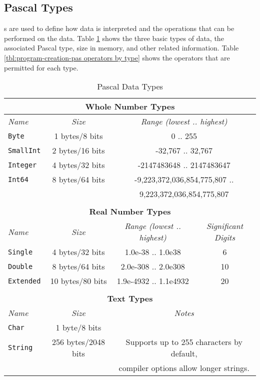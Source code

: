 \clearpage
\subsection{Pascal Types} %
\label{sub:program-creation-pas_types}

s are used to define how data is interpreted and the operations that can be performed on the data. Table \ref{tbl:program-creation-pas-types} shows the three basic types of data, the associated Pascal type, size in memory, and other related information. Table \ref{tbl:program-creation-pas operators by type} shows the operators that are permitted for each type.

\begin{table}[h] 
\begin{minipage}{\textwidth}
\centering
\begin{tabular}{|l|c|c|c|}
\hline
\multicolumn{4}{|c|}{\textbf{Whole Number Types}} \\
\hline
\emph{Name} & \emph{Size} & \multicolumn{2}{c|}{\emph{Range (lowest .. highest)}} \\
\hline
\texttt{Byte} & 1 bytes/8 bits & \multicolumn{2}{c|}{0 .. 255} \\
\texttt{SmallInt} & 2 bytes/16 bits & \multicolumn{2}{c|}{-32,767 .. 32,767} \\
\texttt{Integer} & 4 bytes/32 bits & \multicolumn{2}{c|}{-2147483648 .. 2147483647} \\
\texttt{Int64}    & 8 bytes/64 bits & \multicolumn{2}{c|}{-9,223,372,036,854,775,807 ..} \\
  & & \multicolumn{2}{c|}{9,223,372,036,854,775,807} \\
\hline
\multicolumn{4}{c}{} \\
\hline
\multicolumn{4}{|c|}{\textbf{Real Number Types}} \\
\hline
\emph{Name} & \emph{Size} & \emph{Range (lowest .. highest)} & \emph{Significant Digits} \\
\hline
\texttt{Single} & 4 bytes/32 bits & 1.0e-38 .. 1.0e38 & 6 \\
\texttt{Double} & 8 bytes/64 bits & 2.0e-308 .. 2.0e308 & 10 \\
\texttt{Extended} & 10 bytes/80 bits & 1.9e-4932 .. 1.1e4932 & 20 \\
\hline
\multicolumn{4}{c}{} \\
\hline
\multicolumn{4}{|c|}{\textbf{Text Types}} \\
\hline
\emph{Name} & \emph{Size} & \multicolumn{2}{c|}{\emph{Notes}} \\
\hline
\texttt{Char}  & 1 byte/8 bits & \multicolumn{2}{c|}{} \\
\hline
\texttt{String} & 256 bytes/2048 bits &  \multicolumn{2}{c|}{Supports up to 255 characters by default,} \\
 & & \multicolumn{2}{c|}{compiler options allow longer strings.} \\
\hline
\end{tabular}
\caption{Pascal Data Types}\label{tbl:program-creation-pas-types}
\end{minipage}
\end{table}

